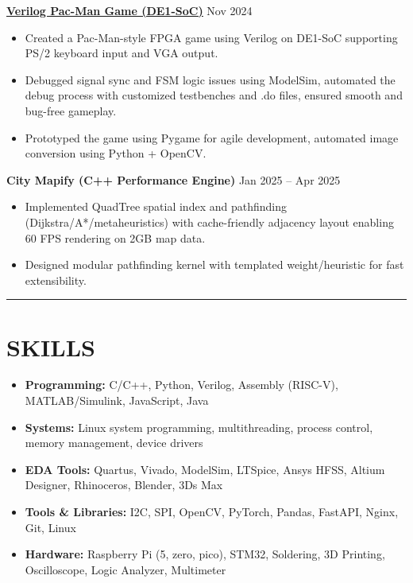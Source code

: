 \documentclass[letterpaper,10pt]{article}
\begin{document}
\vspace{0.3em}
\noindent\href{https://github.com/Ken-2511/ECE241-Project}{\uline{
\textbf{Verilog Pac-Man Game (DE1-SoC)}}} \hfill Nov 2024
\begin{itemize}[leftmargin=0.2in]
    \item Created a Pac-Man-style FPGA game using Verilog on DE1-SoC supporting PS/2 keyboard input and VGA output.
    \item Debugged signal sync and FSM logic issues using ModelSim, automated the debug process with customized testbenches and .do files, ensured smooth and bug-free gameplay.
    \item Prototyped the game using Pygame for agile development, automated image conversion using Python + OpenCV.
\end{itemize}

\vspace{0.3em}
\noindent\textbf{City Mapify (C++ Performance Engine)} \hfill Jan 2025 -- Apr 2025
\begin{itemize}[leftmargin=0.2in]
  \item Implemented QuadTree spatial index and pathfinding (Dijkstra/A*/metaheuristics) with cache-friendly adjacency layout enabling 60 FPS rendering on 2GB map data.
  \item Designed modular pathfinding kernel with templated weight/heuristic for fast extensibility.
\end{itemize}

\noindent\rule{\linewidth}{1pt}


\section*{\textbf{SKILLS}}
\begin{itemize}[leftmargin=0.2in]
    \item \textbf{Programming:} C/C++, Python, Verilog, Assembly (RISC-V), MATLAB/Simulink, JavaScript, Java
    \item \textbf{Systems:} Linux system programming, multithreading, process control, memory management, device drivers
    \item \textbf{EDA Tools:} Quartus, Vivado, ModelSim, LTSpice, Ansys HFSS, Altium Designer, Rhinoceros, Blender, 3Ds Max
    \item \textbf{Tools \& Libraries:} I2C, SPI, OpenCV, PyTorch, Pandas, FastAPI, Nginx, Git, Linux
    \item \textbf{Hardware:} Raspberry Pi (5, zero, pico), STM32, Soldering, 3D Printing, Oscilloscope, Logic Analyzer, Multimeter
\end{itemize}
\end{document}
